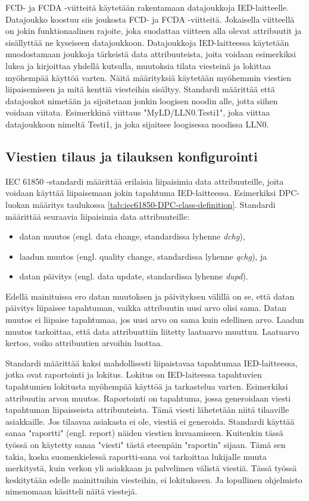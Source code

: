 FCD- ja FCDA -viitteitä käytetään rakentamaan datajoukkoja IED-laitteelle. Datajoukko koostuu siis joukosta FCD- ja FCDA -viitteitä. Jokaisella viitteellä on jokin funktionaalinen rajoite, joka suodattaa viitteen alla olevat attribuutit ja sisällyttää ne kyseiseen datajoukkoon. Datajoukkoja IED-laitteessa käytetään muodostamaan joukkoja tärkeistä data attribuuteista, joita voidaan esimerkiksi lukea ja kirjoittaa yhdellä kutsulla, muutoksia tilata viesteinä ja lokittaa myöhempää käyttöä varten. Näitä määrityksiä käytetään myöhemmin viestien liipaisemiseen ja mitä kenttiä viesteihin sisältyy. Standardi määrittää että datajoukot nimetään ja sijoitetaan jonkin loogisen noodin alle, jotta siihen voidaan viitata. Esimerkkinä viittaus "MyLD/LLN0.Testi1", joka viittaa datajoukkoon nimeltä Testi1, ja joka sijaitsee loogisessa noodissa LLN0. \cite[s.~61--68]{IEC61850-7-2}


\subsection{Viestien tilaus ja tilauksen konfigurointi}
\label{ch:viestien-tilaus-ja-tilauksen-konfigurointi}
IEC 61850 -standardi määrittää erilaisia liipaisimia data attribuuteille, joita voidaan käyttää liipaisemaan jokin tapahtuma IED-laitteessa. Esimerkiksi DPC-luokan määritys taulukossa \ref{tab:iec61850-DPC-class-definition}. Standardi määrittää seuraavia liipaisimia data attribuuteille:
\begin{itemize}
	\item datan muutos (engl. data change, standardissa lyhenne \emph{dchg}),
	\item laadun muutos (engl. quality change, standardissa lyhenne \emph{qchg}), ja
	\item datan päivitys (engl. data update, standardissa lyhenne \emph{dupd}).
\end{itemize}
Edellä mainituissa ero datan muutoksen ja päivityksen välillä on se, että datan päivitys liipaisee tapahtuman, vaikka attribuutin uusi arvo olisi sama. Datan muutos ei liipaise tapahtumaa, jos uusi arvo on sama kuin edellinen arvo. Laadun muutos tarkoittaa, että data attribuuttiin liitetty laatuarvo muuttuu. Laatuarvo kertoo, voiko attribuutien arvoihin luottaa. \cite[s.~90]{IEC61850-7-1}

Standardi määrittää kaksi mahdollisesti liipaistavaa tapahtumaa IED-laitteessa, jotka ovat raportointi ja lokitus. Lokitus on IED-laiteessa tapahtuvien tapahtumien lokitusta myöhempää käyttöä ja tarkastelua varten. Esimerkiksi attribuutin arvon muutos. Raportointi on tapahtuma, jossa generoidaan viesti tapahtuman liipaisseista attribuuteista. Tämä viesti lähetetään niitä tilaaville asiakkaille. Jos tilaavaa asiakasta ei ole, viestiä ei generoida. Standardi käyttää sanaa "raportti" (engl. report) näiden viestien kuvaamiseen. Kuitenkin tässä työssä on käytetty sanaa "viesti" tästä eteenpäin "raportin" sijaan. Tämä sen takia, koska suomenkielessä raportti-sana voi tarkoittaa lukijalle muuta merkitystä, kuin verkon yli asiakkaan ja palvelimen välistä viestiä. Tässä työssä keskitytään edelle mainittuihin viesteihin, ei lokitukseen. Ja lopullinen ohjelmisto nimenomaan käsitteli näitä viestejä.

